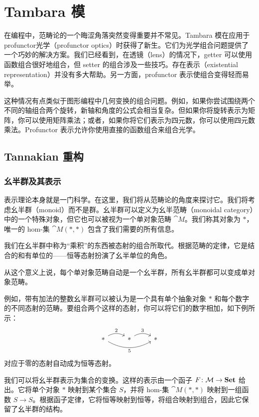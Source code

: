 \documentclass[DaoFP]{subfiles}
\begin{document}
\setcounter{chapter}{18}

\chapter{Tambara 模}

在编程中，范畴论的一个晦涩角落突然变得重要并不常见。Tambara 模在应用于profunctor光学（profunctor optics）时获得了新生。它们为光学组合问题提供了一个巧妙的解决方案。我们已经看到，在透镜（lens）的情况下，getter 可以使用函数组合很好地组合，但 setter 的组合涉及一些技巧。存在表示（existential representation）并没有多大帮助。另一方面，profunctor 表示使组合变得轻而易举。

这种情况有点类似于图形编程中几何变换的组合问题。例如，如果你尝试围绕两个不同的轴组合两个旋转，新轴和角度的公式会相当复杂。但如果你将旋转表示为矩阵，你可以使用矩阵乘法；或者，如果你将它们表示为四元数，你可以使用四元数乘法。Profunctor 表示允许你使用直接的函数组合来组合光学。

\section{Tannakian 重构}

\subsection{幺半群及其表示}

表示理论本身就是一门科学。在这里，我们将从范畴论的角度来探讨它。我们将考虑幺半群（monoid）而不是群。幺半群可以定义为幺半范畴（monoidal category）中的一个特殊对象，但它也可以被视为一个单对象范畴 $\cat M$。我们称其对象为 $*$，唯一的 hom-集 $\cat M( *, *)$ 包含了我们需要的所有信息。

我们在幺半群中称为“乘积”的东西被态射的组合所取代。根据范畴的定律，它是结合的和有单位的——恒等态射扮演了幺半单位的角色。

从这个意义上说，每个单对象范畴自动是一个幺半群，所有幺半群都可以变成单对象范畴。

例如，带有加法的整数幺半群可以被认为是一个具有单个抽象对象 $*$ 和每个数字的不同态射的范畴。要组合两个这样的态射，你可以将它们的数字相加，如下例所示：
\[
 \begin{tikzcd}
  *
  \arrow[r, bend left, "2"]
  \arrow[rr, bend right, "5"']
 & *
 \arrow[r, bend left, "3"]
 & *
  \end{tikzcd}
\]
对应于零的态射自动成为恒等态射。

我们可以将幺半群表示为集合的变换。这样的表示由一个函子 $F \colon \mathcal{M} \to \mathbf{Set}$ 给出。它将单个对象 $*$ 映射到某个集合 $S$，并将 hom-集 $\cat M(*, *)$ 映射到一组函数 $S \to S$。根据函子定律，它将恒等映射到恒等，将组合映射到组合，因此它保留了幺半群的结构。
\end{document}
